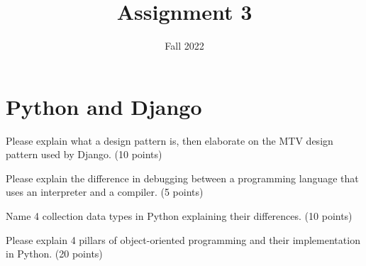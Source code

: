 \documentclass{homework}
\author{}
\date{Fall 2022}
\title{Assignment 3}
\begin{document}
 \maketitle

\section*{Python and Django}
\question Please explain what a design pattern is, then elaborate on the MTV design pattern used by Django. (10 points)


\question Please explain the difference in debugging between a programming language that uses an interpreter and a compiler. (5 points)

\question Name 4 collection data types in Python explaining their differences. (10 points)

\question Please explain 4 pillars of object-oriented programming and their implementation in Python. (20 points)
\end{document}
